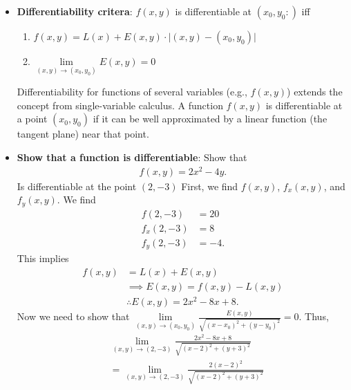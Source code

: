 \documentclass{report}
\begin{document}
\begin{itemize}
            \item \textbf{Differentiability critera}: $f(x,y)$ is differentiable at $(x_{0}, y_{0}:)$ iff 
                \begin{enumerate}
                    \item $f(x,y) = L(x) + E(x,y) \cdot \bigg\lvert (x,y) - (x_{0}, y_{0}) \bigg\rvert $
                    \item $\lim\limits_{(x,y) \to (x_{0}, y_{0})}{E(x,y)}  =0 $
                \end{enumerate}
                \bigbreak \noindent 
                \textbf{}
                Differentiability for functions of several variables (e.g., $f(x,y)$) extends the concept from single-variable calculus. A function  $f(x,y)$ is differentiable at a point $(x_{0}, y_{0})$ if it can be well approximated by a linear function (the tangent plane) near that point.
            \item \textbf{Show that a function is differentiable}: Show that 
                \begin{align*}
                    f(x,y) = 2x^{2} - 4y
                .\end{align*}
                Is differentiable at the point $(2,-3)$
                \bigbreak \noindent 
                First, we find $f(x,y)$, $f_{x}(x,y)$, and $f_{y}(x,y)$. We find
                \begin{align*}
                    f(2,-3) &= 20 \\
                    f_{x}(2,-3) &= 8 \\
                    f_{y}(2,-3) &= -4
                .\end{align*}
                \bigbreak \noindent 
                This implies
                \begin{align*}
                    f(x,y) &= L(x) + E(x,y) \\
                           &\implies E(x,y) = f(x,y) - L(x,y) \\
                           &\therefore E(x,y) = 2x^{2} -8x+8
                .\end{align*}
                \bigbreak \noindent 
            Now we need to show that $\lim\limits_{(x,y) \to (x_{0}, y_{0})}{\frac{E(x,y)}{\sqrt{(x-x_{0})^{2}+(y-y_{0})^{2}}}} =0$. Thus,
            \begin{align*}
            &\lim\limits_{(x,y) \to (2,-3)}{\frac{2x^{2}-8x+8}{\sqrt{(x-2)^{2}+(y+3)^{2}}}}  \\
            &=\lim\limits_{(x,y) \to (2,-3)}{\frac{2(x-2)^{2}}{\sqrt{(x-2)^{2}+(y+3)^{2}}}}  \\ 

\end{align*}
\end{itemize}
\end{document}
